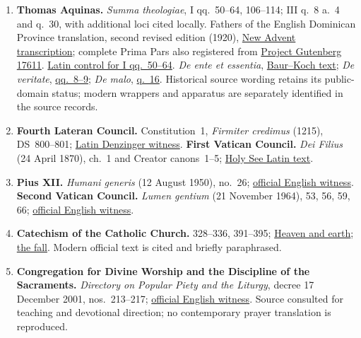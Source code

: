 \begin{enumerate}[leftmargin=1.7em,itemsep=0.5em]
\item \textbf{Thomas Aquinas.} \emph{Summa theologiae}, I qq.~50--64,
106--114; III q.~8 a.~4 and q.~30, with additional loci cited locally.
Fathers of the English Dominican Province translation, second revised
edition (1920), \href{https://www.newadvent.org/summa/}{New Advent
transcription}; complete Prima Pars also registered from
\href{https://www.gutenberg.org/ebooks/17611}{Project Gutenberg 17611}.
\href{https://www.corpusthomisticum.org/sth1050.html}{Latin control for
I qq.~50--64}. \emph{De ente et essentia},
\href{https://www.corpusthomisticum.org/oee.html}{Baur--Koch text};
\emph{De veritate}, \href{https://www.corpusthomisticum.org/qdv08.html}{qq.~8--9};
\emph{De malo}, \href{https://www.corpusthomisticum.org/qdm16.html}{q.~16}.
Historical source wording retains its public-domain status; modern wrappers
and apparatus are separately identified in the source records.

\item \textbf{Fourth Lateran Council.} Constitution~1,
\emph{Firmiter credimus} (1215), DS~800--801;
\href{https://patristica.net/denzinger/enchiridion-symbolorum.html}{Latin
Denzinger witness}. \textbf{First Vatican Council.}
\emph{Dei Filius} (24 April 1870), ch.~1 and Creator canons~1--5;
\href{https://www.vatican.va/archive/hist_councils/i-vatican-council/documents/vat-i_const_18700424_dei-filius_la.html}{Holy
See Latin text}.

\item \textbf{Pius XII.} \emph{Humani generis} (12 August 1950), no.~26;
\href{https://www.vatican.va/content/pius-xii/en/encyclicals/documents/hf_p-xii_enc_12081950_humani-generis.html}{official
English witness}. \textbf{Second Vatican Council.} \emph{Lumen gentium}
(21 November 1964), 53, 56, 59, 66;
\href{https://www.vatican.va/archive/hist_councils/ii_vatican_council/documents/vat-ii_const_19641121_lumen-gentium_en.html}{official
English witness}.

\item \textbf{Catechism of the Catholic Church.} 328--336, 391--395;
\href{https://www.vatican.va/content/catechism/en/part_one/section_two/chapter_one/article_1/paragraph_5_heaven_and_earth.html}{Heaven
and earth};
\href{https://www.vatican.va/content/catechism/en/part_one/section_two/chapter_one/article_1/paragraph_7_the_fall.html}{the
fall}. Modern official text is cited and briefly paraphrased.

\item \textbf{Congregation for Divine Worship and the Discipline of the
Sacraments.} \emph{Directory on Popular Piety and the Liturgy}, decree
17 December 2001, nos.~213--217;
\href{https://www.vatican.va/roman_curia/congregations/ccdds/documents/rc_con_ccdds_doc_20020513_vers-direttorio_en.html}{official
English witness}. Source consulted for teaching and devotional direction;
no contemporary prayer translation is reproduced.


\end{enumerate}
